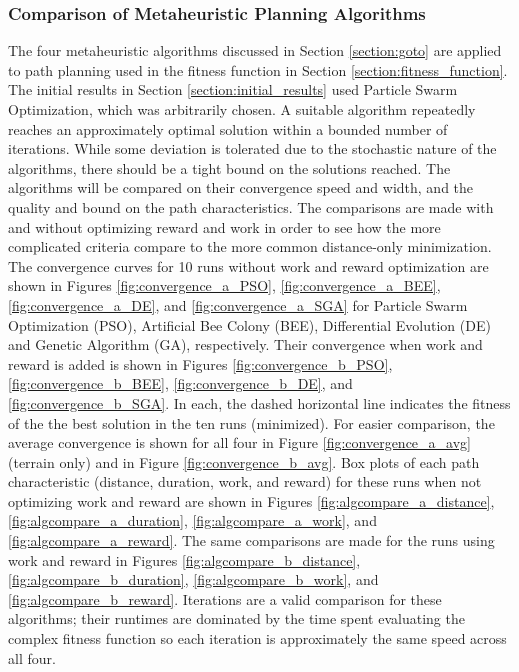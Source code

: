 \documentclass{tamuccthesis}
\begin{document}
\subsubsection{Comparison of Metaheuristic Planning Algorithms}

The four metaheuristic algorithms discussed in Section \ref{section:goto} are applied to path planning used in the fitness function in Section \ref{section:fitness_function}. The initial results in Section \ref{section:initial_results} used Particle Swarm Optimization, which was arbitrarily chosen. A suitable algorithm repeatedly reaches an approximately optimal solution within a bounded number of iterations. While some deviation is tolerated due to the stochastic nature of the algorithms, there should be a tight bound on the solutions reached. The algorithms will be compared on their convergence speed and width, and the quality and bound on the path characteristics. The comparisons are made with and without optimizing reward and work in order to see how the more complicated criteria compare to the more common distance-only minimization. The convergence curves for 10 runs without work and reward optimization are shown in Figures \ref{fig:convergence_a_PSO}, \ref{fig:convergence_a_BEE}, \ref{fig:convergence_a_DE}, and \ref{fig:convergence_a_SGA} for Particle Swarm Optimization (PSO), Artificial Bee Colony (BEE), Differential Evolution (DE) and Genetic Algorithm (GA), respectively. Their convergence when work and reward is added is shown in Figures \ref{fig:convergence_b_PSO}, \ref{fig:convergence_b_BEE}, \ref{fig:convergence_b_DE}, and \ref{fig:convergence_b_SGA}. In each, the dashed horizontal line indicates the fitness of the the best solution in the ten runs (minimized). For easier comparison, the average convergence is shown for all four in Figure \ref{fig:convergence_a_avg} (terrain only) and in Figure \ref{fig:convergence_b_avg}. Box plots of each path characteristic (distance, duration, work, and reward) for these runs when not optimizing work and reward are shown in Figures \ref{fig:algcompare_a_distance}, \ref{fig:algcompare_a_duration}, \ref{fig:algcompare_a_work}, and \ref{fig:algcompare_a_reward}. The same comparisons are made for the runs using work and reward in Figures \ref{fig:algcompare_b_distance}, \ref{fig:algcompare_b_duration}, \ref{fig:algcompare_b_work}, and \ref{fig:algcompare_b_reward}. Iterations are a valid comparison for these algorithms; their runtimes are dominated by the time spent evaluating the complex fitness function so each iteration is approximately the same speed across all four. 
\end{document}
